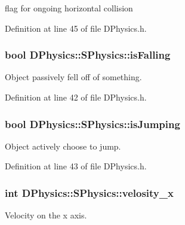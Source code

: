 flag for ongoing horizontal collision 



Definition at line 45 of file D\-Physics.\-h.

\hypertarget{structDPhysics_1_1SPhysics_a39163a65d84fc6d7fd0be57560cffe12}{
\subsubsection[{is\-Falling}]{\setlength{\rightskip}{0pt plus 5cm}bool D\-Physics\-::\-S\-Physics\-::is\-Falling}}\label{structDPhysics_1_1SPhysics_a39163a65d84fc6d7fd0be57560cffe12}


Object passively fell off of something. 



Definition at line 42 of file D\-Physics.\-h.

\hypertarget{structDPhysics_1_1SPhysics_a6fc3e1a46d84fb6dec9f198bb6513856}{
\subsubsection[{is\-Jumping}]{\setlength{\rightskip}{0pt plus 5cm}bool D\-Physics\-::\-S\-Physics\-::is\-Jumping}}\label{structDPhysics_1_1SPhysics_a6fc3e1a46d84fb6dec9f198bb6513856}


Object actively choose to jump. 



Definition at line 43 of file D\-Physics.\-h.

\hypertarget{structDPhysics_1_1SPhysics_a2654e1fd65ea35fe4119c7866fd46274}{
\subsubsection[{velosity\-\_\-x}]{\setlength{\rightskip}{0pt plus 5cm}int D\-Physics\-::\-S\-Physics\-::velosity\-\_\-x}}\label{structDPhysics_1_1SPhysics_a2654e1fd65ea35fe4119c7866fd46274}


Velocity on the x axis. 

